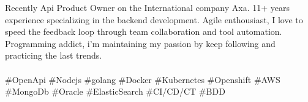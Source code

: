 

\begin{cvparagraph}

Recently Api Product Owner on the International company Axa. 11+ years experience specializing in the backend development. Agile enthousiast, I love to speed the feedback loop through team collaboration and tool automation. Programming addict, i'm maintaining my passion by keep following and practicing the last trends.
\\
\\
 \#OpenApi
 \#Nodejs
 \#golang
 \#Docker
 \#Kubernetes
 \#Openshift
 \#AWS
 \#MongoDb
 \#Oracle
 \#ElasticSearch
 \#CI/CD/CT
 \#BDD 


\end{cvparagraph}
